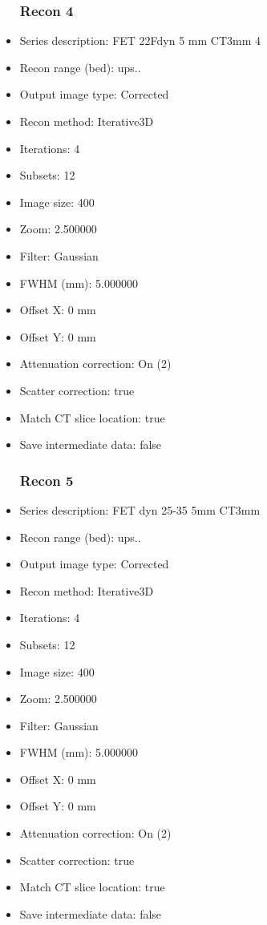 \documentclass[12pt]{article}
\begin{document}
\begin{itemize}
\subsubsection{Recon 4}
\item Series description: FET 22Fdyn 5 mm CT3mm 4
\item Recon range (bed): ups..
\item Output image type: Corrected
\item Recon method: Iterative3D
\item Iterations: 4
\item Subsets: 12
\item Image size: 400
\item Zoom: 2.500000
\item Filter: Gaussian
\item FWHM (mm): 5.000000
\item Offset X: 0 mm
\item Offset Y: 0 mm
\item Attenuation correction: On (2)
\item Scatter correction: true
\item Match CT slice location: true
\item Save intermediate data: false
\subsubsection{Recon 5}
\item Series description: FET dyn 25-35 5mm CT3mm
\item Recon range (bed): ups..
\item Output image type: Corrected
\item Recon method: Iterative3D
\item Iterations: 4
\item Subsets: 12
\item Image size: 400
\item Zoom: 2.500000
\item Filter: Gaussian
\item FWHM (mm): 5.000000
\item Offset X: 0 mm
\item Offset Y: 0 mm
\item Attenuation correction: On (2)
\item Scatter correction: true
\item Match CT slice location: true
\item Save intermediate data: false
\end{itemize}
\end{document}
